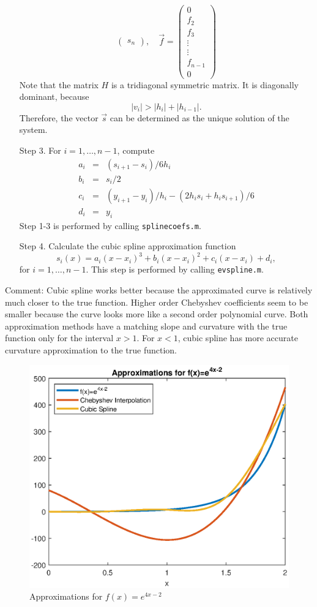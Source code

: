 \documentclass[11pt]{article}
\newcommand{\1}{\mathbbm{1}}
\begin{document}
\begin{enumerate}
\[\begin{pmatrix}
	s_n
\end{pmatrix}, \quad \vec{f}= \begin{pmatrix}
0\\
f_2\\
f_3\\
\vdots\\
\vdots\\
f_{n-1}\\
0
\end{pmatrix} 
	\]
Note that the matrix $H$ is a tridiagonal symmetric matrix. It is diagonally dominant, because
\[|v_i|>|h_i|+|h_{i-1}|.\]
Therefore, the vector $\vec{s}$ can be determined as the unique solution of the system.
	\item[Step 3.] For $i=1,\ldots, n-1$, compute
	\begin{eqnarray*}
	    a_i&=&(s_{i+1}-s_i)/6h_i\\
		b_i&=&s_i/2\\
		c_i&=&(y_{i+1}-y_i)/h_i-(2h_is_i+h_is_{i+1})/6\\
		d_i&=&y_i
	\end{eqnarray*}
 	Step 1-3 is performed by calling \texttt{splinecoefs.m}.
	\item[Step 4.] Calculate the cubic spline approximation function
	\[s_i(x) = a_i(x-x_i)^3 +b_i(x-x_i)^2+c_i(x-x_i)+d_i, \]
	for $i=1,\ldots,n-1$. This step is performed by calling \texttt{evspline.m}.
\end{enumerate}

Comment: Cubic spline works better because the approximated curve is relatively much closer to the true function. Higher order Chebyshev coefficients seem to be smaller because the curve looks more like a second order polynomial curve. Both approximation methods have a matching slope and curvature with the true function only for the interval $x>1$. For $x<1$, cubic spline has more accurate curvature approximation to the true function.

\begin{figure}[h]
	\centering
		\includegraphics[width=\textwidth]{fig1.eps}
	\caption{Approximations for $f(x)=e^{4x-2}$}
	\label{2a:1}
\end{figure}
\end{document}
